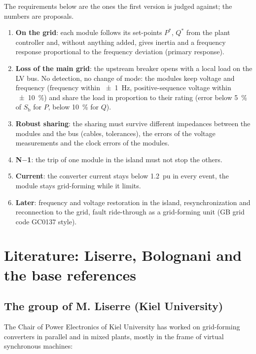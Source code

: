 \documentclass[11pt,a4paper]{scrartcl}
\newcommand{\ped}[1]{_{\mathrm{#1}}}
\begin{document}
\begin{onehalfspace}
The requirements below are the ones the first version is judged against; the numbers are proposals.

\begin{enumerate}[label=R\arabic*., nosep]
	\item \textbf{On the grid}: each module follows its set-points $P^*$, $Q^*$ from the plant controller and, without anything added, gives inertia and a frequency response proportional to the frequency deviation (primary response).
	\item \textbf{Loss of the main grid}: the upstream breaker opens with a local load on the LV bus. No detection, no change of mode: the modules keep voltage and frequency (frequency within \SI{\pm 1}{Hz}, positive-sequence voltage within \SI{\pm 10}{\percent}) and share the load in proportion to their rating (error below \SI{5}{\percent} of $S\ped{b}$ for $P$, below \SI{10}{\percent} for $Q$).
	\item \textbf{Robust sharing}: the sharing must survive different impedances between the modules and the bus (cables, tolerances), the errors of the voltage measurements and the clock errors of the modules.
	\item \textbf{N$-$1}: the trip of one module in the island must not stop the others.
	\item \textbf{Current}: the converter current stays below \SI{1.2}{pu} in every event, the module stays grid-forming while it limits.
	\item \textbf{Later}: frequency and voltage restoration in the island, resynchronization and reconnection to the grid, fault ride-through as a grid-forming unit (GB grid code GC0137 style).
\end{enumerate}

\section{Literature: Liserre, Bolognani and the base references}
\label{sec:literature}

\subsection{The group of M. Liserre (Kiel University)}

The Chair of Power Electronics of Kiel University has worked on grid-forming converters in parallel and in mixed plants, mostly in the frame of virtual synchronous machines:


\end{onehalfspace}
\end{document}

